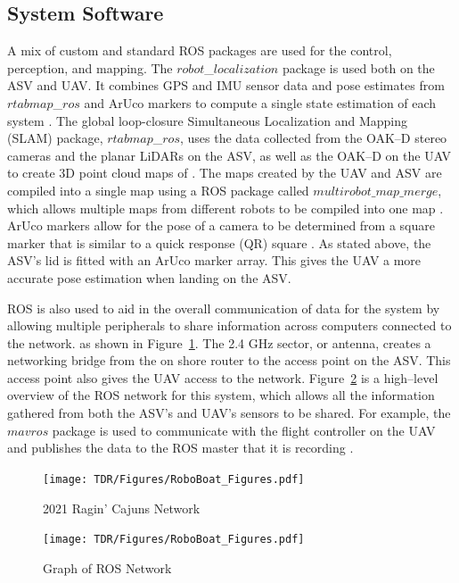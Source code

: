 \documentclass[letterpaper, 12 pt, conference]{ieeeconf}
\begin{document}
\subsection{System Software}
% 
A mix of custom and standard ROS packages are used for the control, perception, and mapping. The $robot$\_$localization$ package is used both on the ASV and UAV. It combines GPS and IMU sensor data and  pose estimates from $rtabmap$\_$ros$ and ArUco markers to compute a single state estimation of each system \cite{MooreStouchKeneralizedEkf2014}. The global loop-closure Simultaneous Localization and Mapping (SLAM) package, $rtabmap$\_$ros$, uses the data collected from the OAK--D stereo cameras and the planar LiDARs on the ASV, as well as the  OAK--D on the UAV to create 3D point cloud maps of \cite{Rtabmap}. The maps created by the UAV and ASV are compiled into a single map using a ROS package called $multirobot\_map\_merge$, which allows multiple maps from different robots to be compiled into one map \cite{multirobotmap}. ArUco markers allow for the pose of a camera to be determined from a square marker that is similar to a quick response (QR) square \cite{Aruco}. As stated above, the ASV's lid is fitted with an ArUco marker array. This gives the UAV a more accurate pose estimation when landing on the ASV.

ROS is also used to aid in the overall communication of data for the system by allowing multiple peripherals to share information across computers connected to the network. as shown in Figure~\ref{fig:Network}. The 2.4 GHz sector, or antenna, creates a networking bridge from the on shore router to the access point on the ASV. This access point also gives the UAV access to the network. Figure~\ref{fig:ROSGraph} is a high--level overview of the ROS network for this system, which allows all the information gathered from both the ASV's and UAV's sensors to be shared. For example, the $mavros$ package is used to communicate with the flight controller on the UAV and publishes the data to the ROS master that it is recording \cite{mavros}.
% 
\begin{figure}[tb]
\vspace{0.09in}
\centering
\texttt{[image: TDR/Figures/RoboBoat\_Figures.pdf]}
\caption{2021 Ragin' Cajuns Network}
\label{fig:Network}
\end{figure}
% 
\begin{figure}[tb]
\vspace{0.13in}
\centering
\texttt{[image: TDR/Figures/RoboBoat\_Figures.pdf]}
\caption{Graph of ROS Network}
\label{fig:ROSGraph}
\end{figure}
% 
\end{document}
